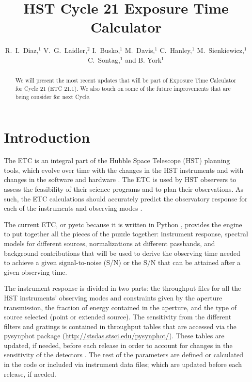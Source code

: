 
\resetcounters




\title{HST Cycle 21 Exposure Time Calculator}
\author{R.~I.~Diaz,$^1$ V.~G.~Laidler,$^2$ I.~Busko,$^1$ M.~Davis,$^1$ C.~Hanley,$^1$ M.~Sienkiewicz,$^1$ C.~Sontag,$^1$ and B. York$^1$
}


\begin{abstract}
We will present the most recent updates that will be part of Exposure Time Calculator for Cycle 21 (ETC 21.1). We also touch on some of the future improvements that are being consider for next Cycle. 
\end{abstract}

\section{Introduction}
The ETC is an integral part of the  Hubble Space Telescope (HST) planning tools, which evolve over time with the changes in the HST instruments and with changes in the software and hardware \citep{Diaz3_2010, Diazetal_2010}. The ETC is used by HST observers to assess the feasibility of their science programs and to plan their observations. As such, the ETC calculations should accurately predict the observatory response for each of the instruments and observing modes \citep{Diaz_2012}.

The current ETC, or pyetc because it is written in Python \citep{pyetc2010}, provides the engine to put together all the pieces of the puzzle together: instrument response, spectral models for different sources, normalizations at different passbands, and background contributions that will be used to derive the observing time needed to achieve a given signal-to-noise (S/N) or the S/N that can be attained after a given observing time.

The instrument response is divided in two parts: the throughput files for all the HST instruments' observing modes  and constraints given by  the aperture transmission, the  fraction of energy contained in the aperture, and the type of source selected (point or extended source). The sensitivity from the different filters and gratings is contained in throughput tables that are accessed via the pysynphot package (\url{http://stsdas.stsci.edu/pysynphot/}). These tables are updated, if needed, before each release in order to account for changes in the sensitivity of the detectors \citep{cdbs_2012}. The rest of the parameters are defined or calculated in the code or included via instrument data files; which are updated before each release, if needed.

